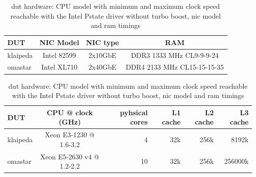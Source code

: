 \begin{table}[!ht]
	
	\vspace{3ex}
	\begin{tabular}[]{ l | c | c | c }
		DUT & NIC Model & NIC type & RAM \\ \hline
		klaipeda & Intel 82599 & 2x10GbE & DDR3 1333 MHz CL9-9-9-24 \\
		omastar & Intel XL710 & 2x40GbE & DDR4 2133 MHz CL15-15-15-35
	\end{tabular}

	\vspace{2ex}
	\begin{tabular}[]{ l | c | r | r | r | r }
		DUT & CPU @ clock (GHz) & pyhsical cores & L1 cache & L2 cache & L3 cache \\ \hline
		klaipeda & Xeon E3-1230 @ 1.6-3.2 & 4 & 32k & 256k & 8192k \\
		omastar & Xeon E5-2630 v4 @ 1.2-2.2 & 10 & 32k & 256k & 256000k
	\end{tabular}

	\caption{\Ac{dut} hardware: CPU model with minimum and maximum clock speed reachable with the Intel Pstate driver without turbo boost, \Ac{nic} model and \Ac{ram} timings}
	\label{table:hardware}
\end{table}




